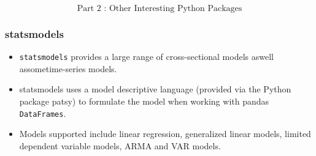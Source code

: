 \documentclass[MASTER.tex]{subfiles}
\begin{document}
 
	
	
\begin{frame}
\[ \mbox{Part 2 : Other Interesting Python Packages} \]
\end{frame}

\begin{frame}
	\frametitle{statsmodels}
	\begin{itemize}
	\item \texttt{statsmodels} provides a large range of cross-sectional models aswell assometime-series models. 
	\item statsmodels
	uses a model descriptive language (provided via the Python package patsy) to formulate the model
	when working with pandas \texttt{DataFrames}.
	\item Models supported include linear regression, generalized linear
	models, limited dependent variable models, ARMA and VAR models.
	\end{itemize}
\end{frame}
\end{document}
